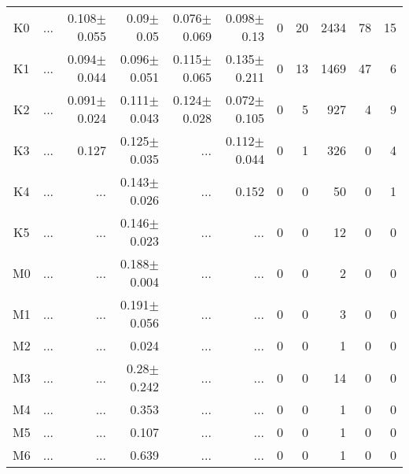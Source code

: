 \begin{table}[t]
\begin{center}
\begin{tabular}{c|rrrrr|rrrrr}
K0	&	 ...	&	0.108$\pm$0.055	&	0.09$\pm$0.05	&	0.076$\pm$0.069	&	0.098$\pm$0.13	&	0	&	20	&	2434	&	78	&	15	\\
K1	&	 ...	&	0.094$\pm$0.044	&	0.096$\pm$0.051	&	0.115$\pm$0.065	&	0.135$\pm$0.211	&	0	&	13	&	1469	&	47	&	6	\\
K2	&	 ...	&	0.091$\pm$0.024	&	0.111$\pm$0.043	&	0.124$\pm$0.028	&	0.072$\pm$0.105	&	0	&	5	&	927	&	4	&	9	\\
K3	&	 ...	&	0.127	&	0.125$\pm$0.035	&	 ...	&	0.112$\pm$0.044	&	0	&	1	&	326	&	0	&	4	\\
K4	&	 ...	&	 ...	&	0.143$\pm$0.026	&	 ...	&	0.152	&	0	&	0	&	50	&	0	&	1	\\
K5	&	 ...	&	 ...	&	0.146$\pm$0.023	&	 ...	&	 ...	&	0	&	0	&	12	&	0	&	0	\\
M0	&	 ...	&	 ...	&	0.188$\pm$0.004	&	 ...	&	 ...	&	0	&	0	&	2	&	0	&	0	\\
M1	&	 ...	&	 ...	&	0.191$\pm$0.056	&	 ...	&	 ...	&	0	&	0	&	3	&	0	&	0	\\
M2	&	 ...	&	 ...	&	0.024	&	 ...	&	 ...	&	0	&	0	&	1	&	0	&	0	\\
M3	&	 ...	&	 ...	&	0.28$\pm$0.242	&	 ...	&	 ...	&	0	&	0	&	14	&	0	&	0	\\
M4	&	 ...	&	 ...	&	0.353	&	 ...	&	 ...	&	0	&	0	&	1	&	0	&	0	\\
M5	&	 ...	&	 ...	&	0.107	&	 ...	&	 ...	&	0	&	0	&	1	&	0	&	0	\\
M6	&	 ...	&	 ...	&	0.639	&	 ...	&	 ...	&	0	&	0	&	1	&	0	&	0	\\
    \bottomrule
    \end{tabular}
\end{center}
\end{table}

